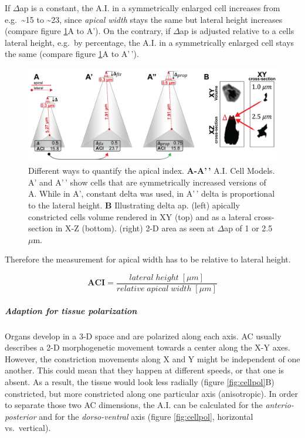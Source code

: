 \documentclass[10pt, b5paper, singlespacinge, twoside]{reedthesis} %
\theoremstyle{definition}
\theoremstyle{definition}
\theoremstyle{definition}
\theoremstyle{remark}
\begin{document}
If \(\Delta\)ap is a constant, the A.I. in a symmetrically enlarged cell increases from e.g.~\textasciitilde15 to \textasciitilde23, since \emph{apical width} stays the same but lateral height increases (compare figure \ref{fig:ACICells}A to A'). On the contrary, if \(\Delta\)ap is adjusted relative to a cells lateral height, e.g.~by percentage, the A.I. in a symmetrically enlarged cell stays the same (compare figure \ref{fig:ACICells}A to A'\,').


\begin{figure}[H]

{\centering \includegraphics[width=0.85\linewidth]{figures/summary/aci_fig-01} 

}

\caption[Different ways to quantify the apical index]{Different ways to quantify the apical index. \textbf{A-A'\,'} A.I. Cell Models. A' and A'\,' show cells that are symmetrically increased versions of A. While in A', constant delta was used, in A'\,' delta is proportional to the lateral height. \textbf{B} Illustrating delta ap. (left) apically constricted cells volume rendered in XY (top) and as a lateral cross-section in X-Z (bottom). (right) 2-D area as seen at \(\Delta\)ap of 1 or 2.5 \(\mu\)m.}\label{fig:ACICells}
\end{figure}
Therefore the measurement for apical width has to be relative to lateral height.

\[\mathbf{ACI} = \frac{lateral\;height\;[\mu m]}{relative\;apical\;width\;[\mu m]}\]

\hypertarget{ACI-pol}{%
\subparagraph{Adaption for tissue polarization}\label{ACI-pol}}

Organs develop in a 3-D space and are polarized along each axis. AC usually describes a 2-D morphogenetic movement towards a center along the X-Y axes. However, the constriction movements along X and Y might be independent of one another. This could mean that they happen at different speeds, or that one is absent. As a result, the tissue would look less radially (figure \ref{fig:cellpol}B) constricted, but more constricted along one particular axis (anisotropic). In order to separate those two AC dimensions, the A.I. can be calculated for the \emph{anterio-posterior} and for the \emph{dorso-ventral} axis (figure \ref{fig:cellpol}, horizontal vs.~vertical).
\end{document}
